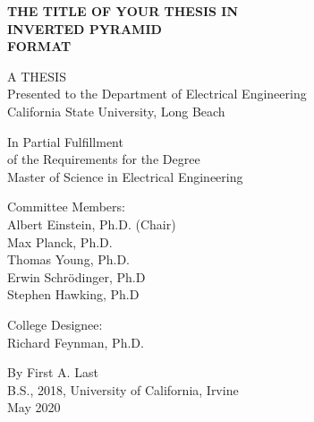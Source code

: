 \begin{titlepage}
\begin{center}

	\doublespacing
	\textbf{THE TITLE OF YOUR THESIS IN\\ INVERTED PYRAMID\\ FORMAT}
	
	\vfill

	A THESIS \\
	Presented to the Department of Electrical Engineering \\
	California State University, Long Beach

	\vfill

	In Partial Fulfillment \\
	of the Requirements for the Degree \\
	Master of Science in Electrical Engineering

	\vfill

	Committee Members: \\
	\singlespacing
	Albert Einstein, Ph.D. (Chair) \\
	Max Planck, Ph.D. \\
	Thomas Young, Ph.D. \\
	Erwin Schr\"{o}dinger, Ph.D \\
	Stephen Hawking, Ph.D \\

	\doublespacing

	College Designee: \\
	Richard Feynman, Ph.D. \\

	\vfill

	By First A. Last \\
	B.S., 2018, University of California, Irvine\\
	May 2020	
\end{center}
\end{titlepage}
